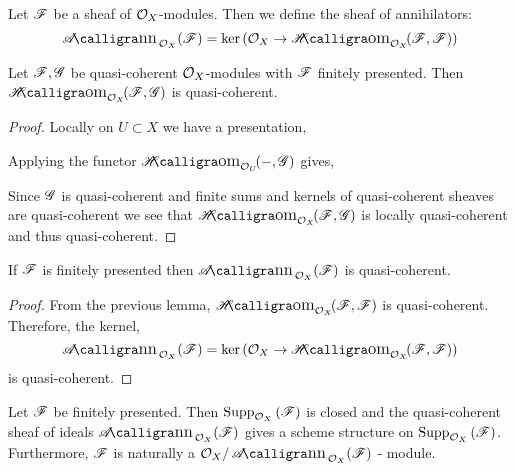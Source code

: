 \documentclass[12pt]{article}
\begin{document}
\begin{defn}
Let $\mathscr{F}$ be a sheaf of $\mathcal{O}_{X}$-modules. Then we define the sheaf of annihilators: 
\[ \shAnn{\struct{X}}{\F} = \ker{(\struct{X} \to \shHom{\struct{X}}{\F}{\F})} \]
\end{defn}

\begin{lemma}
Let $\mathscr{F}, \mathscr{G}$ be quasi-coherent $\mathcal{O}_{X}$-modules with $\mathscr{F}$ finitely presented. Then $\shHom{\struct{X}}{\F}{\G}$ is quasi-coherent.
\end{lemma}

\begin{proof}
Locally on $U \subset X$ we have a presentation,
\begin{center}
\end{center}
Applying the functor $\shHom{\struct{U}}{-}{\G}$ gives,
\begin{center}
\end{center}
Since $\mathscr{G}$ is quasi-coherent and finite sums and kernels of quasi-coherent sheaves are quasi-coherent we see that $\shHom{\struct{X}}{\F}{\G}$ is locally quasi-coherent and thus quasi-coherent.
\end{proof}

\begin{lemma}
If $\mathscr{F}$ is finitely presented then $\shAnn{\struct{X}}{\F}$ is quasi-coherent.
\end{lemma}

\begin{proof}
From the previous lemma, $\shHom{\struct{X}}{\F}{\F}$ is quasi-coherent. Therefore, the kernel,
\[ \shAnn{\struct{X}}{\F} = \ker{(\struct{X} \to \shHom{\struct{X}}{\F}{\F})} \]
is quasi-coherent.
\end{proof}

\begin{prop}
Let $\mathscr{F}$ be finitely presented. Then $\mathrm{Supp}_{\mathcal{O}_{X}}\left(\mathscr{F} \right)$ is closed and the quasi-coherent sheaf of ideals $\shAnn{\struct{X}}{\F}$ gives a scheme structure on $\mathrm{Supp}_{\mathcal{O}_{X}}\left(\mathscr{F} \right)$. Furthermore, $\mathscr{F}$ is naturally a $\struct{X} / \shAnn{\struct{X}}{\F}$ - module.
\end{prop}
\end{document}

